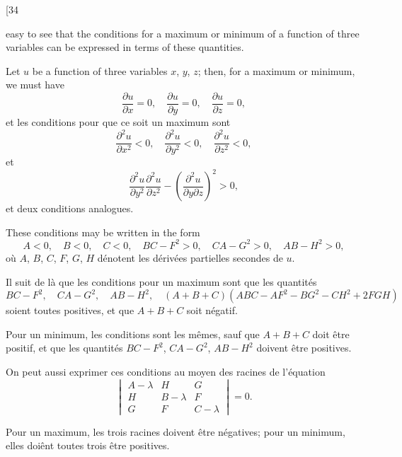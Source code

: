 \documentclass[11pt,a4paper]{article}
\begin{document}
\newpage
\setcounter{page}{228}

\begin{center}
{\small [34}
\end{center}
\vspace{-1em}

easy to see that the conditions for a maximum or minimum of a function of three
variables can be expressed in terms of these quantities.

Let $u$ be a function of three variables $x$, $y$, $z$; then, for a maximum or minimum,
we must have
\[
\frac{\partial u}{\partial x} = 0, \quad \frac{\partial u}{\partial y} = 0, \quad \frac{\partial u}{\partial z} = 0,
\]
et les conditions pour que ce soit un maximum sont
\[
\frac{\partial^2 u}{\partial x^2} < 0, \quad \frac{\partial^2 u}{\partial y^2} < 0, \quad \frac{\partial^2 u}{\partial z^2} < 0,
\]
et
\[
\frac{\partial^2 u}{\partial y^2} \frac{\partial^2 u}{\partial z^2} - \left(\frac{\partial^2 u}{\partial y \partial z}\right)^2 > 0,
\]
et deux conditions analogues.

\newpage
\setcounter{page}{229}

These conditions may be written in the form
\[
A < 0, \quad B < 0, \quad C < 0, \quad BC - F^2 > 0, \quad CA - G^2 > 0, \quad AB - H^2 > 0,
\]
o\`{u} $A$, $B$, $C$, $F$, $G$, $H$ d\'{e}notent les d\'{e}riv\'{e}es partielles secondes de $u$.

Il suit de l\`{a} que les conditions pour un maximum sont que les quantit\'{e}s
\[
BC - F^2, \quad CA - G^2, \quad AB - H^2, \quad (A+B+C)(ABC - AF^2 - BG^2 - CH^2 + 2FGH)
\]
soient toutes positives, et que $A+B+C$ soit n\'{e}gatif.

\newpage
\setcounter{page}{230}

Pour un minimum, les conditions sont les m\^{e}mes, sauf que $A+B+C$ doit \^{e}tre
positif, et que les quantit\'{e}s $BC-F^2$, $CA-G^2$, $AB-H^2$ doivent \^{e}tre positives.

On peut aussi exprimer ces conditions au moyen des racines de l'\'{e}quation
\[
\begin{vmatrix}
A - \lambda & H & G \\
H & B - \lambda & F \\
G & F & C - \lambda
\end{vmatrix} = 0.
\]

Pour un maximum, les trois racines doivent \^{e}tre n\'{e}gatives; pour un minimum, elles
doi\^{e}nt toutes trois \^{e}tre positives.

\newpage
\setcounter{page}{231}
\end{document}
